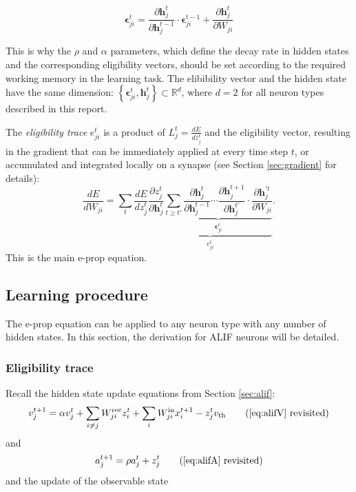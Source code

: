         \begin{equation}
        \mathbf{\epsilon}^t_{ji} = \frac{\partial\mathbf{h}_j^{t}}{\partial\mathbf{h}_j^{t-1}}\cdot\mathbf{\epsilon}^{t-1}_{ji} + \frac{\partial\mathbf{h}^t_j}{\partial W_{ji}}
        \end{equation}

        This is why the $\rho$ and $\alpha$ parameters, which define the decay rate in hidden states and the corresponding eligibility vectors, should be set according to the required working memory in the learning task.
        The elibibility vector and the hidden state have the same dimension: $\left\{\mathbf{\epsilon}^t_{ji}, \mathbf{h}^t_j\right\} \subset \mathbb{R}^d$, where $d=2$ for all neuron types described in this report.

        The \emph{eligibility trace} $e^t_{ji}$ is a product of $L^t_j = \frac{dE}{dz_j^t}$ and the eligibility vector, resulting in the gradient that can be immediately applied at every time step $t$, or accumulated and integrated locally on a synapse (see Section \ref{sec:gradient} for details):
        \begin{equation}
        \frac{dE}{dW_{ji}} = \sum_t\frac{dE}{dz_j^t}\underbrace{\frac{\partial z_j^t}{\partial\mathbf{h}_j^t}\underbrace{\sum_{t\geq t'}\frac{\partial\mathbf{h}^t_j}{\partial\mathbf{h}_j^{t-1}} \cdots \frac{\partial\mathbf{h}_j^{t+1}}{\partial\mathbf{h}_j^{t'}}\cdot\frac{\partial\mathbf{h}_j^{'t}}{\partial W_{ji}}}_{\mathbf{\epsilon}_{ji}^t}}_{e^t_{ji}}.
        \end{equation}
        This is the main e-prop equation.

    \subsection{Learning procedure}

        The e-prop equation can be applied to any neuron type with any number of hidden states.
        In this section, the derivation for ALIF neurons will be detailed.

        \subsubsection{Eligibility trace}
        Recall the hidden state update equations from Section \ref{sec:alif}:
        \begin{equation*}
        v^{t+1}_j = \alpha v_j^t + \sum_{i\neq j}W^\text{rec}_{ji}z_i^t + \sum_i W^\text{in}_{ji}x_i^{t+1} - z_j^tv_
        \text{th} \tag{\ref{eq:alifV} revisited}
        \end{equation*}
        and
        \begin{equation*}
        a^{t+1}_j = \rho a^t_j + z^t_j \tag{\ref{eq:alifA} revisited}
        \end{equation*}
        and the update of the observable state

